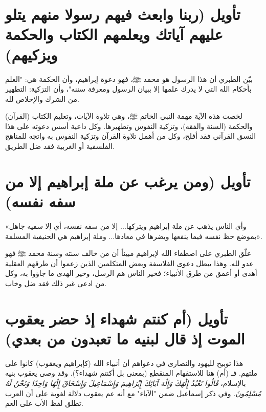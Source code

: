 \separator

\section{تأويل (ربنا وابعث فيهم رسولا منهم يتلو عليهم آياتك ويعلمهم الكتاب والحكمة ويزكيهم)}
بيّن الطبري أن هذا الرسول هو محمد ﷺ، فهو دعوة إبراهيم، وأن الحكمة هي: "العلم بأحكام الله التي لا يدرك علمها إلا ببيان الرسول ومعرفة سننه"، وأن التزكية: التطهير من الشرك والإخلاص لله.
\begin{fawaid}
لخصت هذه الآية مهمة النبي الخاتم ﷺ، وهي تلاوة الآيات، وتعليم الكتاب (القرآن) والحكمة (السنة والفقه)، وتزكية النفوس وتطهيرها. وكل داعية أسس دعوته على هذا النسق القرآني فقد أفلح، وكل من أهمل تلاوة القرآن وتزكية النفوس به واتجه للمناهج الفلسفية أو الغربية فقد ضل الطريق.
\end{fawaid}

\separator

\section{تأويل (ومن يرغب عن ملة إبراهيم إلا من سفه نفسه)}
 «وأي الناس يذهب عن ملة إبراهيم ويتركها... إلا من سفه نفسه، أي إلا سفيه جاهل بموضع حظ نفسه فيما ينفعها ويضرها في معادها... وملة إبراهيم هي الحنيفية المسلمة».

\begin{fawaid}
علّق الطبري على اصطفاء الله لإبراهيم مبيناً أن من خالف سنته وسنة محمد ﷺ فهو عدو لله. وهذا يبطل دعوى الفلاسفة وبعض المتكلمين الذين زعموا أن طرقهم العقلية أهدى أو أعمق من طرق الأنبياء؛ فخير الناس هم الرسل، وخير الهدى ما جاؤوا به، وكل من ادعى غير ذلك فقد ضل وخاب.
\end{fawaid}

\separator

\section{تأويل (أم كنتم شهداء إذ حضر يعقوب الموت إذ قال لبنيه ما تعبدون من بعدي)}
هذا توبيخ لليهود والنصارى في دعواهم أن أنبياء الله (كإبراهيم ويعقوب) كانوا على ملتهم. فـ (أم) هنا للاستفهام المنقطع (بمعنى بل أكنتم شهداء؟). 
وقد وصى يعقوب بنيه بالإسلام، \textit{قَالُوا نَعْبُدُ إِلَٰهَكَ وَإِلَٰهَ آبَائِكَ إِبْرَاهِيمَ وَإِسْمَاعِيلَ وَإِسْحَاقَ إِلَٰهًا وَاحِدًا وَنَحْنُ لَهُ مُسْلِمُونَ}. وفي ذكر إسماعيل ضمن "الآباء" مع أنه عم يعقوب دلالة لغوية على أن العرب تطلق لفظ الأب على العم.

